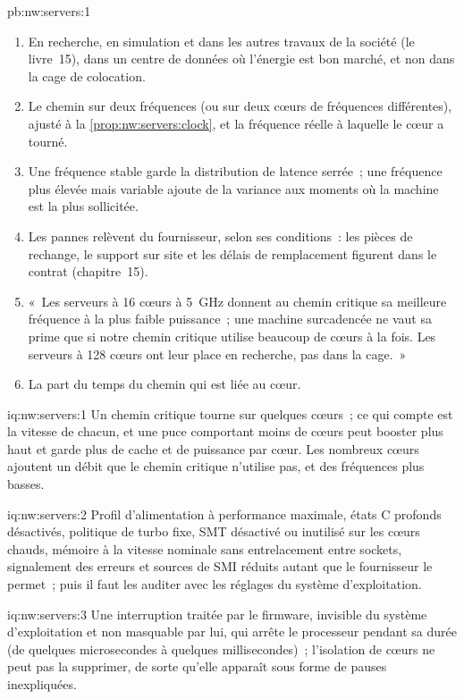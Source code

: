 \begin{solution}{pb:nw:servers:1}
\begin{enumerate}
\item En recherche, en simulation et dans les autres travaux de la société (le livre~15), dans un centre de données où l'énergie est bon marché, et non dans la cage de colocation.
\item Le chemin sur deux fréquences (ou sur deux cœurs de fréquences différentes), ajusté à la \cref{prop:nw:servers:clock}, et la fréquence réelle à laquelle le cœur a tourné.
\item Une fréquence stable garde la distribution de latence serrée~; une fréquence plus élevée mais variable ajoute de la variance aux moments où la machine est
  la plus sollicitée.
\item Les pannes relèvent du fournisseur, selon ses conditions~: les pièces de rechange, le support sur site et les délais de remplacement figurent dans le contrat (chapitre~15).
\item «~Les serveurs à 16 cœurs à 5~GHz donnent au chemin critique sa meilleure fréquence à la plus faible puissance~; une machine surcadencée ne vaut sa prime que si notre
  chemin critique utilise beaucoup de cœurs à la fois. Les serveurs à 128 cœurs ont leur place en recherche, pas dans la cage.~»
\item La part du temps du chemin qui est liée au cœur.
\end{enumerate}
\end{solution}

\begin{solution}{iq:nw:servers:1}
Un chemin critique tourne sur quelques cœurs~; ce qui compte est la vitesse de chacun, et une puce comportant moins de cœurs peut booster plus haut et garde plus de cache
et de puissance par cœur. Les nombreux cœurs ajoutent un débit que le chemin critique n'utilise pas, et des fréquences plus basses.
\end{solution}

\begin{solution}{iq:nw:servers:2}
Profil d'alimentation à performance maximale, états C profonds désactivés, politique de turbo fixe, SMT désactivé ou inutilisé sur les cœurs chauds, mémoire à la vitesse nominale sans
entrelacement entre sockets, signalement des erreurs et sources de SMI réduits autant que le fournisseur le permet~; puis il faut les auditer avec les réglages du système d'exploitation.
\end{solution}

\begin{solution}{iq:nw:servers:3}
Une interruption traitée par le firmware, invisible du système d'exploitation et non masquable par lui, qui arrête le processeur pendant sa durée (de quelques microsecondes
à quelques millisecondes)~; l'isolation de cœurs ne peut pas la supprimer, de sorte qu'elle apparaît sous forme de pauses inexpliquées.
\end{solution}


